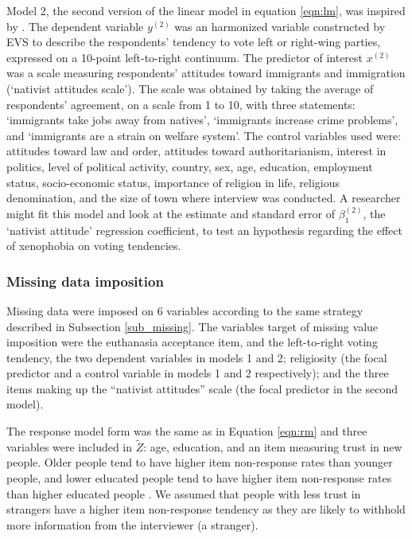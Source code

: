 	Model 2, the second version of the linear model in equation \ref{eqn:lm}, was inspired by \cite{immerzeel:2015}.
	The dependent variable $y^{(2)}$ was an harmonized variable constructed by EVS to describe the respondents' 
	tendency to vote left or right-wing parties, expressed on a 10-point left-to-right continuum.
	The predictor of interest $x^{(2)}$ was a scale measuring respondents' attitudes toward immigrants and immigration 
	(`nativist attitudes scale').
	The scale was obtained by taking the average of respondents' agreement, on a scale from 1 to 10, with three 
	statements: `immigrants take jobs away from natives', `immigrants increase crime problems', and 
	`immigrants are a strain on welfare system'.
	The control variables used were: 
	attitudes toward law and order, attitudes toward authoritarianism, interest in politics, level of political activity,  
	country, sex, age, education, employment status, socio-economic status, importance of religion in life, 
	religious denomination, and the size of town where interview was conducted.
	A researcher might fit this model and look at the estimate and standard error of $\beta^{(2)}_{1}$, 
	the `nativist attitude' regression coefficient, to test an hypothesis regarding the effect of xenophobia on voting 
	tendencies.

\subsubsection{Missing data imposition}

	Missing data were imposed on 6 variables according to the same strategy described in Subsection \ref{sub_missing}.
	The variables target of missing value imposition were the euthanasia acceptance item, and the 
	left-to-right voting tendency, the two dependent variables in models 1 and 2; 
	religiosity (the focal predictor and a control variable in models 1 and 2 respectively);
	and the three items making up the ``nativist attitudes'' scale (the focal predictor in the second model).

	The response model form was the same as in Equation \eqref{eqn:rm} and three variables were included in $\tilde{Z}$: 
	age, education, and an item measuring trust in new people. 
	Older people tend to have higher item non-response rates than younger people, and 
	lower educated people tend to have higher item non-response rates than higher educated people 
	\citep{guadagnoliCleary:1992, leeuwEtAl:2003}.
	We assumed that people with less trust in strangers have a higher item non-response tendency as 
	they are likely to withhold more information from the interviewer (a stranger).

